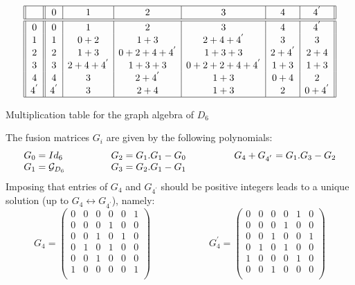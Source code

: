 \documentclass[a4paper,11pt]{article}
\begin{document}
\begin{table}[hhh]
$$
\begin{array}{||c||c|c|c|c|c|c||}
\hline
{}& 0 & 1 & 2 & 3 & 4 & 4^{'}   \\
\hline
\hline
0     & 0     & 1         & 2           & 3             & 4       & 4^{'}    \\
1     & 1     & 0+2       & 1+3         & 2+4+4^{'}     & 3       & 3        \\
2     & 2     & 1+3       & 0+2+4+4^{'} & 1+3+3         & 2+4^{'} & 2+4      \\
3     & 3     & 2+4+4^{'} & 1+3+3       & 0+2+2+4+4^{'} & 1+3     & 1+3      \\
4     & 4     & 3         & 2+4^{'}     & 1+3           & 0+4     & 2        \\
4^{'} & 4^{'} & 3         & 2+4         & 1+3           & 2       & 0+4^{'}  \\
\hline
\end{array}
$$
\caption{Multiplication table for the graph algebra of $D_6$}
\end{table}
The fusion matrices $G_{i}$ are given by the following polynomials:
$$
\begin{array}{lll}
G_0 = Id_6 \qquad \qquad &   G_2 = G_1.G_1 - G_0 \qquad \qquad & G_4
+ G_{4^{'}} = G_1.G_3 - G_2 \\
G_1 = {\cal G}_{D_6}  & G_3 = G_2.G_1 - G_1 &  {}
\end{array}
$$
Imposing that entries of $G_4$ and $G_{4^{'}}$ should be positive
integers leads to a unique solution (up to $G_4 \leftrightarrow
G_{4^{'}}$), namely:
$$
G_4 = \left( \begin{array}{cccccc}
0 & 0 & 0 & 0 & 0 & 1 \\
0 & 0 & 0 & 1 & 0 & 0 \\
0 & 0 & 1 & 0 & 1 & 0 \\
0 & 1 & 0 & 1 & 0 & 0 \\
0 & 0 & 1 & 0 & 0 & 0 \\
1 & 0 & 0 & 0 & 0 & 1 \\
\end{array}
\right)
\qquad \qquad \qquad
G_4^{'} = \left( \begin{array}{cccccc}
0 & 0 & 0 & 0 & 1 & 0 \\
0 & 0 & 0 & 1 & 0 & 0 \\
0 & 0 & 1 & 0 & 0 & 1 \\
0 & 1 & 0 & 1 & 0 & 0 \\
1 & 0 & 0 & 0 & 1 & 0 \\
0 & 0 & 1 & 0 & 0 & 0 \\
\end{array}
\right)
$$
\end{document}
